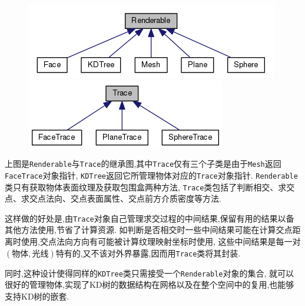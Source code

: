 \begin{figure}[H]
  \begin{minipage}[b]{0.46\linewidth}
    \centering
    \includegraphics[width=\textwidth]{res/renderable_inherit.png}
  \end{minipage}
  \begin{minipage}[b]{0.46\linewidth}
    \centering
    \includegraphics[width=\textwidth]{res/trace_inherit.png}
  \end{minipage}
\end{figure}

上图是\verb|Renderable|与\verb|Trace|的继承图,其中\verb|Trace|仅有三个子类是由于\verb|Mesh|返回\verb|FaceTrace|对象指针,
\verb|KDTree|返回它所管理物体对应的\verb|Trace|对象指针.
\verb|Renderable|类只有获取物体表面纹理及获取包围盒两种方法,
\verb|Trace|类包括了判断相交、求交点、求交点法向、交点表面属性、交点前方介质密度等方法.

这样做的好处是,由\verb|Trace|对象自己管理求交过程的中间结果,保留有用的结果以备其他方法使用,节省了计算资源.
如判断是否相交时一些中间结果可能在计算交点距离时使用,交点法向方向有可能被计算纹理映射坐标时使用,
这些中间结果是每一对$ (物体,光线)$特有的,又不该对外界暴露,因而用\verb|Trace|类将其封装.

同时,这种设计使得同样的\verb|KDTree|类只需接受一个\verb|Renderable|对象的集合,
就可以很好的管理物体,实现了KD树的数据结构在网格以及在整个空间中的复用,也能够支持KD树的嵌套.

